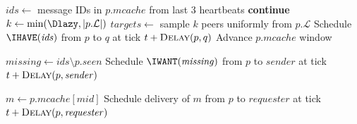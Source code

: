 \documentclass{article}
\begin{document}

\begin{algorithm}[H]
\caption{Gossip Emission (\IHAVE)}
\label{alg:gossip}
\begin{algorithmic}[1]
    \State $\mathit{ids} \gets$ message IDs in $p.\mathit{mcache}$ from last 3 heartbeats
        \State \textbf{continue}
    \EndIf
    \State $k \gets \min(\Dlazy, |p.\mathcal{L}|)$
    \State $\mathit{targets} \gets$ sample $k$ peers uniformly from $p.\mathcal{L}$
            \State Schedule $\IHAVE(\mathit{ids})$ from $p$ to $q$ at tick $t + \Call{Delay}{p, q}$
        \EndIf
    \EndFor
    \State Advance $p.\mathit{mcache}$ window 
\EndFor
\EndProcedure
\end{algorithmic}
\end{algorithm}


\begin{algorithm}[H]
\caption{Process \IHAVE / \IWANT}
\label{alg:ihave-iwant}
\begin{algorithmic}[1]
    \State $\mathit{missing} \gets \mathit{ids} \setminus p.\mathit{seen}$
        \State Schedule $\IWANT(\mathit{missing})$ from $p$ to $\mathit{sender}$ at tick $t + \Call{Delay}{p, \mathit{sender}}$
    \EndIf
\EndProcedure

            \State $m \gets p.\mathit{mcache}[\mathit{mid}]$
            \State Schedule delivery of $m$ from $p$ to $\mathit{requester}$ at tick $t + \Call{Delay}{p, \mathit{requester}}$
        \EndIf
    \EndFor
\EndProcedure
\end{algorithmic}
\end{algorithm}

\end{document}
